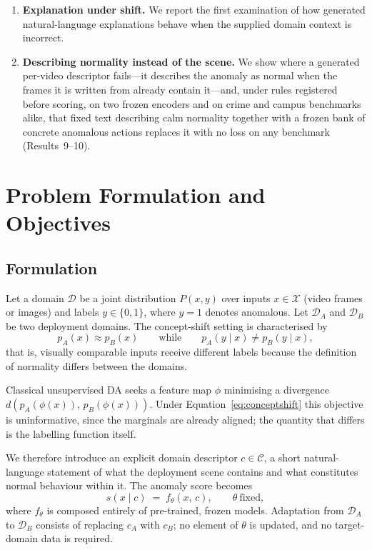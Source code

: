 \documentclass[a4paper,fleqn]{cas-sc}
\begin{document}
\begin{enumerate}[C1.]
  \item \textbf{Explanation under shift.} We report the first examination of how
        generated natural-language explanations behave when the supplied domain
        context is incorrect.

  \item \textbf{Describing normality instead of the scene.} We show where a
        generated per-video descriptor fails---it describes the anomaly as normal
        when the frames it is written from already contain it---and, under rules
        registered before scoring, on two frozen encoders and on crime and campus
        benchmarks alike, that fixed text describing calm normality together
        with a frozen bank of concrete anomalous actions replaces it with no loss
        on any benchmark (Results~9--10).
\end{enumerate}

\section{Problem Formulation and Objectives}
\label{sec:problem}

\subsection{Formulation}
Let a domain $\mathcal{D}$ be a joint distribution $P(x,y)$ over inputs
$x \in \mathcal{X}$ (video frames or images) and labels $y \in \{0,1\}$, where
$y=1$ denotes anomalous. Let $\mathcal{D}_A$ and $\mathcal{D}_B$ be two
deployment domains. The concept-shift setting is characterised by
\begin{equation}
p_A(x) \approx p_B(x)
\qquad\text{while}\qquad
p_A(y \mid x) \neq p_B(y \mid x),
\label{eq:conceptshift}
\end{equation}
that is, visually comparable inputs receive different labels because the
definition of normality differs between the domains.

Classical unsupervised DA seeks a feature map $\phi$ minimising a divergence
$d\!\left(p_A(\phi(x)),\, p_B(\phi(x))\right)$. Under
Equation~\eqref{eq:conceptshift} this objective is uninformative, since the
marginals are already aligned; the quantity that differs is the labelling
function itself.

We therefore introduce an explicit domain descriptor $c \in \mathcal{C}$, a short
natural-language statement of what the deployment scene contains and what
constitutes normal behaviour within it. The anomaly score becomes
\begin{equation}
s(x \mid c) \;=\; f_\theta(x,\, c), \qquad \theta \ \text{fixed},
\label{eq:score}
\end{equation}
where $f_\theta$ is composed entirely of pre-trained, frozen models. Adaptation
from $\mathcal{D}_A$ to $\mathcal{D}_B$ consists of replacing $c_A$ with $c_B$;
no element of $\theta$ is updated, and no target-domain data is required.
\end{document}
